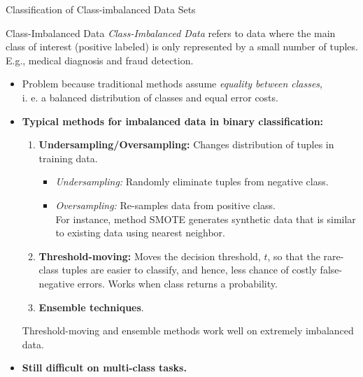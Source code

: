 \begin{frame}{Classification of Class-imbalanced Data Sets}
	\vspace*{-0.5em}
	\begin{block}{Class-Imbalanced Data}
		\textit{Class-Imbalanced Data} refers to data where the main class of interest (positive labeled) is only represented by a small number of tuples. E.g., medical diagnosis and fraud detection.
	\end{block}
	\begin{itemize}
		\item Problem because traditional methods assume \textit{equality between
			      classes},\\ i. e. a balanced distribution of classes and equal error
		      costs.
		\item \textbf{Typical methods for imbalanced data in binary classification:}
		      \begin{enumerate}
			      \item \textbf{\color{airforceblue}Undersampling/Oversampling:} Changes distribution of tuples in training data.
			            \begin{itemize}
				            \item \textit{Undersampling:} Randomly eliminate tuples from negative class.
				            \item \textit{Oversampling:} Re-samples data from positive class.\\ For instance, method SMOTE generates synthetic data that is similar to existing data using nearest neighbor.
			            \end{itemize}
			      \item \textbf{\color{airforceblue}Threshold-moving:} Moves the decision threshold, $t$, so that the rare-class tuples are easier to classify, and hence, less chance of costly false-negative errors. Works when class returns a probability.
			      \item \textbf{\color{airforceblue}Ensemble techniques}.
		      \end{enumerate}
		      Threshold-moving and ensemble methods work well on extremely imbalanced data.
		\item \textbf{Still difficult on multi-class tasks.}
	\end{itemize}
\end{frame}
